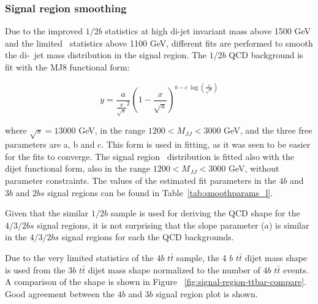 \subsubsection{Signal region smoothing}
\label{sec:boosted-SR-smoothing}

Due to the improved $1/2b$ statistics at high di-\largeR jet invariant mass above 1500 GeV and the limited \ttbar\ statistics above 1100 GeV, different fits are performed to smooth the di-\largeR\ jet mass distribution in the signal region. The $1/2b$ QCD background is fit with the MJ8 functional form:

\begin{equation}
\label{eq:boosted_dijet}
y = \frac{a}{\frac{x}{\sqrt{s}}^2} (1-\frac{x}{\sqrt{s}})^{b - c\ \log(\frac{x}{\sqrt{s}})}
\end{equation}

where $\sqrt{s} = 13000$ GeV, in the range $1200 < M_{JJ} < 3000$ GeV, and the three free parameters are a, b and c. This form is used in fitting, as it was seen to be easier for the fits to converge.  The signal region \ttbar\ distribution is fitted also with the dijet functional form, also in the range $1200 < M_{JJ} < 3000$ GeV, without parameter constraints. The values of the estimated fit parameters in the $4b$ and $3b$ and $2bs$ signal regions can be found in Table~\ref{tab:smoothparams_l}.

Given that the similar $1/2b$ sample is used for deriving the QCD shape for the $4/3/2bs$  signal regions, it is not surprising that the slope parameter ($a$) is similar in  the  $4/3/2bs$  signal regions for each the QCD backgrounds.

Due to the very limited statistics of the $4b$ $t\bar{t}$ sample, the 4 $b$ $t\bar{t}$ dijet mass shape is used from the $3b$ $t\bar{t}$ dijet mass shape normalized to the number of $4b$ $t\bar{t}$ events. A comparison of the shape is shown in Figure ~\ref{fig:signal-region-ttbar-compare}. Good agreement between the $4b$ and $3b$ signal region plot is shown.

